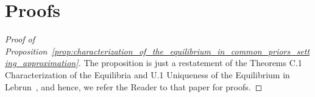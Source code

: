 \section{Proofs} %
\label{sec:proofs_approximation}
\begin{proof}[Proof of Proposition~\ref{prop:characterization_of_the_equilibrium_in_common_priors_setting_approximation}]
The proposition is just a restatement of the Theorems C.1 Characterization of the Equilibria and U.1 Uniqueness of the Equilibrium in Lebrun~\cite{Lebrun2006}, and hence, we refer the Reader to that paper for proofs.
\end{proof}
